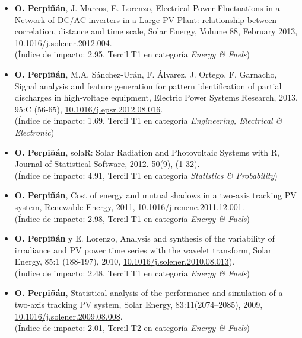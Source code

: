 \documentclass[article, a4paper]{memoir}
\begin{document}
\begin{itemize}
\item \textbf{O. Perpiñán}, J. Marcos, E. Lorenzo, Electrical Power Fluctuations in a Network of DC/AC inverters in a Large PV Plant: relationship between correlation, distance and time scale, Solar Energy, Volume 88, February 2013, \href{http://dx.doi.org/10.1016/j.solener.2012.12.004}{10.1016/j.solener.2012.004}. \\ (Índice de impacto: 2.95, Tercil T1 en categoría \emph{Energy \& Fuels})

\item \textbf{O. Perpiñán}, M.A. Sánchez-Urán, F. Álvarez, J. Ortego, F. Garnacho, Signal analysis and feature generation for pattern identification of partial discharges in high-voltage equipment, Electric Power Systems Research, 2013, 95:C (56-65), \href{http://dx.doi.org/10.1016/j.epsr.2012.08.016}{10.1016/j.epsr.2012.08.016}.\\ (Índice de impacto: 1.69, Tercil T1 en categoría \emph{Engineering, Electrical \& Electronic})

\item \textbf{O. Perpiñán}, solaR: Solar Radiation and Photovoltaic Systems with R, Journal of Statistical Software, 2012. 50(9), (1-32). \\ (Índice de impacto: 4.91, Tercil T1 en categoría \emph{Statistics \& Probability})

\item \textbf{O. Perpiñán}, Cost of energy and mutual shadows in a two-axis tracking PV system, Renewable Energy, 2011, \href{http://dx.doi.org/10.1016/j.renene.2011.12.001}{10.1016/j.renene.2011.12.001}. \\ (Índice de impacto: 2.98, Tercil T1 en categoría \emph{Energy \& Fuels})

\item \textbf{O. Perpiñán} y E. Lorenzo, Analysis and synthesis of the variability of irradiance and PV power time series with the wavelet transform, Solar Energy, 85:1 (188-197), 2010, \href{http://dx.doi.org/10.1016/j.solener.2010.08.013}{10.1016/j.solener.2010.08.013}).\\ (Índice de impacto: 2.48, Tercil T1 en categoría \emph{Energy \& Fuels})

\item \textbf{O. Perpiñán}, Statistical analysis of the performance and simulation of a two-axis tracking PV system, Solar Energy, 83:11(2074–2085), 2009, \href{http://dx.doi.org/10.1016/j.solener.2009.08.008}{10.1016/j.solener.2009.08.008}. \\(Índice de impacto: 2.01, Tercil T2 en categoría \emph{Energy \& Fuels})


\end{itemize}
\end{document}
